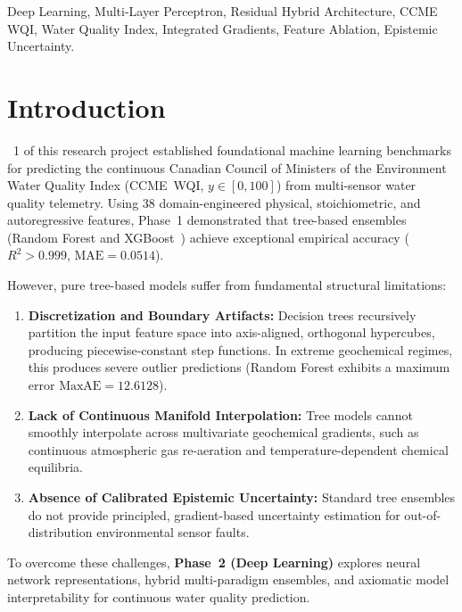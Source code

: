 \documentclass[conference]{IEEEtran}
\begin{document}
\begin{IEEEkeywords}
Deep Learning, Multi-Layer Perceptron, Residual Hybrid Architecture, CCME WQI,
Water Quality Index, Integrated Gradients, Feature Ablation, Epistemic Uncertainty.
\end{IEEEkeywords}

\section{Introduction}
\label{sec:intro}

~1 of this research project established foundational
machine learning benchmarks for predicting the continuous Canadian Council of Ministers
of the Environment Water Quality Index (CCME~WQI, $y \in [0, 100]$) from multi-sensor
water quality telemetry. Using 38 domain-engineered physical, stoichiometric, and
autoregressive features, Phase~1 demonstrated that tree-based ensembles (Random Forest
and XGBoost~\cite{chen2016xgboost}) achieve exceptional empirical accuracy
($R^2 > 0.999$, $\text{MAE} = 0.0514$).

However, pure tree-based models suffer from fundamental structural limitations:
\begin{enumerate}
  \item \textbf{Discretization and Boundary Artifacts:} Decision trees recursively
        partition the input feature space into axis-aligned, orthogonal hypercubes,
        producing piecewise-constant step functions. In extreme geochemical regimes,
        this produces severe outlier predictions (Random Forest exhibits a maximum
        error $\text{MaxAE} = 12.6128$).
  \item \textbf{Lack of Continuous Manifold Interpolation:} Tree models cannot
        smoothly interpolate across multivariate geochemical gradients, such as
        continuous atmospheric gas re-aeration and temperature-dependent chemical
        equilibria.
  \item \textbf{Absence of Calibrated Epistemic Uncertainty:} Standard tree ensembles
        do not provide principled, gradient-based uncertainty estimation for
        out-of-distribution environmental sensor faults.
\end{enumerate}

To overcome these challenges, \textbf{Phase~2 (Deep Learning)} explores neural network
representations, hybrid multi-paradigm ensembles, and axiomatic model interpretability
for continuous water quality prediction.
\end{document}
